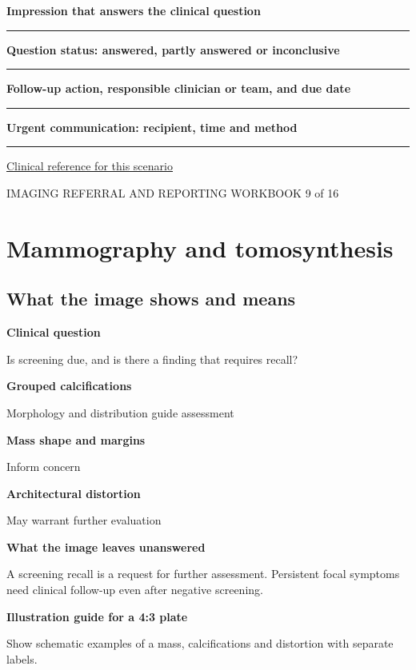 \documentclass[11pt,a4paper]{article}
\newcommand{\record}[1]{\textbf{#1}\par\vspace{0.55\baselineskip}\hrule\vspace{0.35\baselineskip}}
\begin{document}
\record{Impression that answers the clinical question}

\record{Question status: answered, partly answered or inconclusive}

\record{Follow-up action, responsible clinician or team, and due date}

\record{Urgent communication: recipient, time and method}

\small\href{https://www.uspreventiveservicestaskforce.org/uspstf/recommendation/breast-cancer-screening}{Clinical reference for this scenario}

\normalsize

\newpage

{\small IMAGING REFERRAL AND REPORTING WORKBOOK \hfill 9 of 16}

\section*{Mammography and tomosynthesis}

\subsection*{What the image shows and means}

\textbf{Clinical question}\par Is screening due, and is there a finding that requires recall?\par

\textbf{Grouped calcifications}\par Morphology and distribution guide assessment\par

\textbf{Mass shape and margins}\par Inform concern\par

\textbf{Architectural distortion}\par May warrant further evaluation\par

\textbf{What the image leaves unanswered}\par A screening recall is a request for further assessment. Persistent focal symptoms need clinical follow-up even after negative screening.\par

\textbf{Illustration guide for a 4:3 plate}\par Show schematic examples of a mass, calcifications and distortion with separate labels.\par
\end{document}
